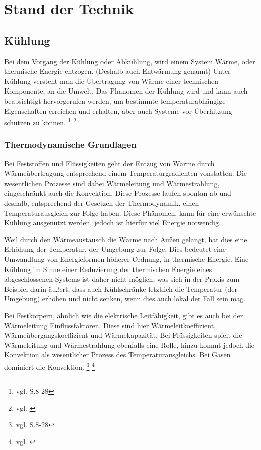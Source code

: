 \chapter{Stand der Technik}



\section{Kühlung} 

Bei dem Vorgang der Kühlung oder Abkühlung, wird einem System Wärme, oder thermische Energie entzogen. (Deshalb auch Entwärmung genannt)
Unter Kühlung versteht man die Übertragung von Wärme einer technischen Komponente, an die Umwelt. Das Phänomen der Kühlung wird und kann auch beabsichtigt hervorgerufen werden, um bestimmte temperaturabhängige Eigenschaften erreichen und erhalten, aber auch Systeme vor Überhitzung schützen zu können. \footnote{vgl. \cite{Kuehlung1} S.8-28} \footnote{vgl. \cite{Kuehlung2}}

\subsection{Thermodynamische Grundlagen}

Bei Feststoffen und Flüssigkeiten geht der Entzug von Wärme durch Wärmeübertragung entsprechend einem Temperaturgradienten vonstatten. Die wesentlichen Prozesse sind dabei Wärmeleitung und Wärmestrahlung, eingeschränkt auch die Konvektion. Diese Prozesse laufen spontan ab und deshalb, entsprechend der Gesetzen der Thermodynamik, einen Temperaturausgleich zur Folge haben. Diese Phänomen, kann für eine erwünschte Kühlung ausgenützt werden, jedoch ist hierfür viel Energie notwendig.  

Weil durch den Wärmeaustausch die Wärme nach Außen gelangt, hat dies eine Erhöhung der Temperatur, der Umgebung zur Folge. Dies bedeutet eine Umwandlung von Energieformen höherer Ordnung, in thermische Energie. Eine Kühlung im Sinne einer Reduzierung der thermischen Energie eines abgeschlossenen Systems ist daher nicht möglich, was sich in der Praxis zum Beispiel darin äußert, dass auch Kühlschränke letztlich die Temperatur (der Umgebung) erhöhen und nicht senken, wenn dies auch lokal der Fall sein mag.

Bei Festkörpern, ähnlich wie die elektrische Leitfähigkeit, gibt es auch bei der Wärmeleitung Einflussfaktoren. Diese sind hier Wärmeleitkoeffizient, Wärmeübergangskoeffizient und Wärmekapazität. Bei Flüssigkeiten spielt die Wärmeleitung und Wärmestrahlung ebenfalls eine Rolle, hinzu kommt jedoch die Konvektion als wesentlicher Prozess des Temperaturausgleichs. Bei Gasen dominiert die Konvektion. \footnote{vgl. \cite{Kuehlung1} S.8-28} \footnote{vgl. \cite{Kuehlung2}}

